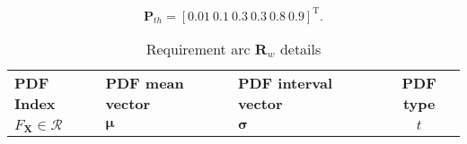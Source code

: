 \begin{equation*}
    \mathbf{P}_{th} = \left[0.01~0.1~0.3~0.3~0.8~0.9\right]^{\mathrm{T}}.
\end{equation*}

\begin{table}[h!]
	\centering
	\renewcommand{\arraystretch}{1.0}%
	\footnotesize\addtolength{\tabcolsep}{-5pt}
	\caption{Requirement arc $\mathbf{R}_w$ details}
	\label{table:requirementarcex}
	\begin{tabular}{l>{\centering\arraybackslash}p{4.2cm}>{\centering\arraybackslash}p{6cm}c}
	\hline\hline

	\bf \ac{PDF} Index & \bf \ac{PDF} mean vector & \bf \ac{PDF} interval vector & \bf \ac{PDF} type \\
	$F_\mathbf{X} \in \mathcal{R}$ &$\boldsymbol{{\mu}}$ & $\boldsymbol{{\sigma}}$ & $t$ \\ \hline


\end{tabular}
\end{table}
